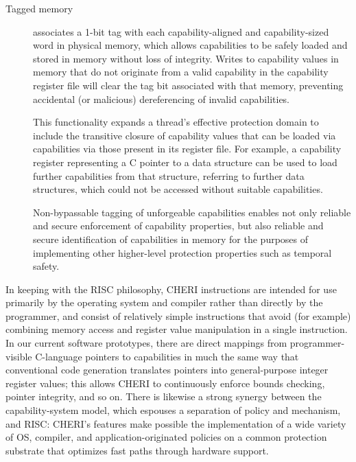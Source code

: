 \begin{description}
\item[Tagged memory] associates a 1-bit tag with each capability-aligned and capability-sized word in physical memory, which allows capabilities to be safely loaded and stored in memory without loss of integrity.
  Writes to capability values in memory that do not originate from a valid capability in the capability register file will clear the tag bit associated with that memory, preventing accidental (or malicious) dereferencing
  of invalid capabilities.

This functionality expands a thread's effective protection domain to include the transitive closure of capability values that can be loaded via capabilities via those present in its register file.  For example, a capability register representing a C pointer to a data structure can be used to load further capabilities from that structure, referring to further data structures, which could not be accessed without suitable capabilities.

Non-bypassable tagging of unforgeable capabilities enables not only reliable
and secure enforcement of capability properties, but also reliable and secure
identification of capabilities in memory for the purposes of implementing
other higher-level protection properties such as temporal safety.
\end{description}

In keeping with the RISC philosophy, CHERI instructions are intended for use
primarily
by the operating system and compiler rather than directly by the programmer, and consist of relatively simple instructions that avoid (for example) combining memory access and register value manipulation in a single instruction.
In our current software prototypes, there are direct mappings from programmer-visible C-language pointers to capabilities in much the same way that conventional code generation translates pointers into general-purpose integer register values; this allows CHERI to continuously enforce bounds checking, pointer integrity, and so on.
There is likewise a strong synergy between the capability-system
model, which espouses a separation of policy and mechanism, and RISC: CHERI's features make possible
the implementation of a wide variety of OS, compiler, and application-originated policies on a common protection substrate that optimizes fast paths through hardware support.

